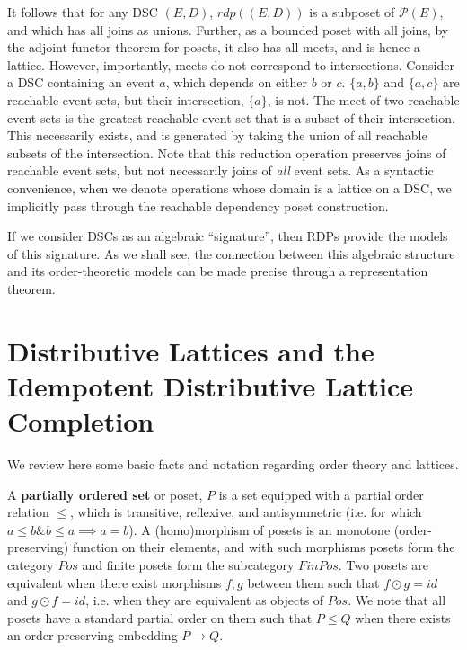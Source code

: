 \documentclass[hoptionsi,review,screen,format=sigconf]{acmart}
\theoremstyle{definition}
\newcommand{\Pc}{\mathcal{P}}
\newcommand{\band}{\mathop{\&}}
\begin{document}
It follows that for any DSC \((E,D)\), \(rdp((E,D))\)  is a subposet of \(\Pc(E)\), and which has all joins as unions. Further, as a bounded poset with all joins, by the adjoint functor theorem for posets, it also has all  meets, and is hence a lattice. However, importantly, meets do not correspond to intersections. Consider a DSC containing an event \(a\), which depends on either \(b\) or \(c\). \(\{a,b\}\) and  \(\{a,c\}\) are reachable event sets, but their intersection, \(\{a\}\), is not. The meet of two reachable event sets is the greatest reachable event set that is a subset of their intersection. This necessarily exists, and is generated by taking the union of all reachable subsets of the intersection. Note that this reduction operation preserves joins of reachable event sets, but not necessarily joins of \textit{all} event sets. As a syntactic convenience, when we denote operations whose domain is a lattice on a DSC, we implicitly pass through the reachable dependency poset construction.

If we consider DSCs as an algebraic ``signature'', then RDPs provide the models of this signature. As we shall see, the connection between this algebraic structure and its order-theoretic models can be made precise through a representation theorem.

\section{Distributive Lattices and the Idempotent Distributive Lattice Completion}

We review here some basic facts and notation regarding order theory and lattices.

A \textbf{partially ordered set} or poset, \(P\) is a set equipped with a partial order relation \(\le\), which is transitive,  reflexive, and antisymmetric (i.e. for which \( a \le b \band b \le a \implies a = b\)). A (homo)morphism of posets is an monotone (order-preserving) function on their elements, and with such morphisms posets form the category \(Pos\) and finite posets form the subcategory \(FinPos\). Two posets are equivalent when there exist morphisms \(f, g\) between them such that \(f \odot g = id\) and \(g \odot f = id\), i.e. when they are equivalent as objects of \(Pos\). We note that all posets have a standard partial order on them such that \(P \le Q\) when there exists an order-preserving embedding \(P \rightarrow Q\).
\end{document}
